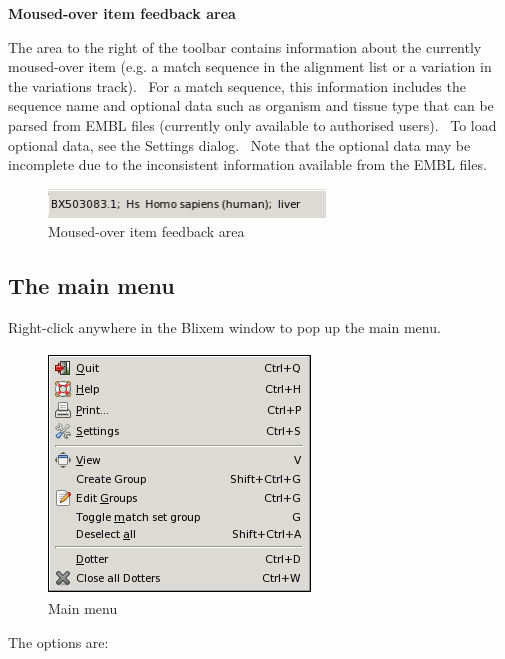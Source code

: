 \documentclass[letterpaper]{article}
\begin{document}
\bigskip

{\bfseries
Moused-over item feedback area}

{The area to the right of the toolbar contains information about the
currently moused-over item (e.g. a match sequence in the alignment list
or a variation in the variations track). \ For a match sequence, this
information includes the sequence name and optional data such as
organism and tissue type that can be parsed from EMBL files (currently
only available to authorised users). \ To load optional data, see the
Settings dialog. \ Note that the optional data may be incomplete due to
the inconsistent information available from the EMBL files.}

\begin{figure}
\centering
\color[rgb]{0.30980393,0.5058824,0.7411765}
\includegraphics[width=7.355cm,height=0.771cm]{img_view_feedback_area.png}
\caption{Moused-over item feedback area}
\end{figure}

\bigskip

{\color[rgb]{0.30980393,0.5058824,0.7411765}\subsection[The main menu]{The main menu}}
\hypertarget{RefHeading1781056909880}{}{
Right-click anywhere in the Blixem window to pop up the main menu.}

\begin{figure}
\centering
\color[rgb]{0.30980393,0.5058824,0.7411765}
\includegraphics[width=6.951cm,height=6.428cm]{img_menu_right_click.png}
\caption{Main menu}
\end{figure}

{The options are:}
\end{document}
